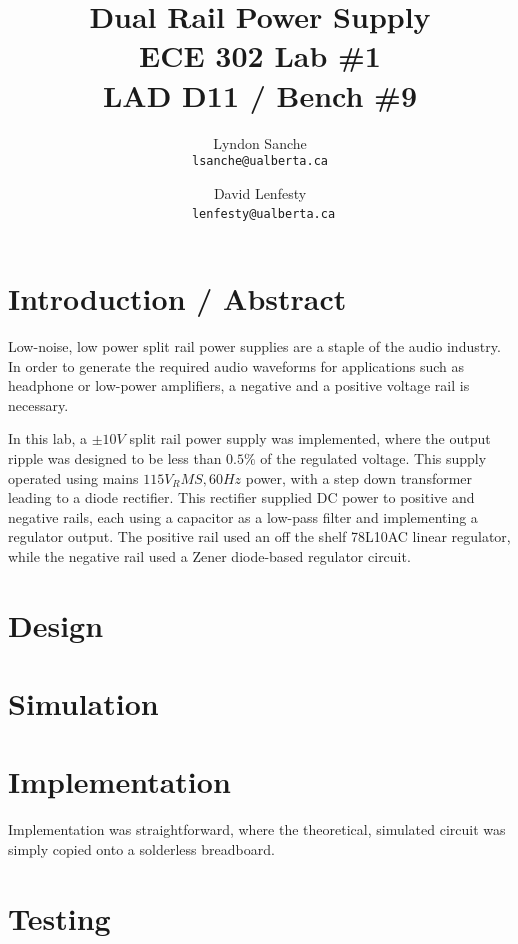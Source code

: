\documentclass[12pt]{article}
\title{ {\Huge Dual Rail Power Supply } \\
    ECE 302 Lab \#1 \\ LAD D11 / Bench \#9}
\author{
    Lyndon Sanche\\
    \texttt{lsanche@ualberta.ca}
    \and
    David Lenfesty\\\
    \texttt{lenfesty@ualberta.ca}
}
\begin{document}

\maketitle
\newpage
\tableofcontents

\newpage
{}

\section{Introduction / Abstract}

Low-noise, low power split rail power supplies are a staple of the audio industry.
In order to generate the required audio waveforms for applications such as headphone or
low-power amplifiers, a negative and a positive voltage rail is necessary.

In this lab, a $\pm 10 V$ split rail power supply was implemented,
where the output ripple was designed to be less than $ 0.5 \% $ of the
regulated voltage. This supply operated using mains $115 V_RMS, 60Hz $ power, with
a step down transformer leading to a diode rectifier. This rectifier supplied DC power to
positive and negative rails, each using a capacitor as a low-pass filter and implementing
a regulator output. The positive rail used an off the shelf 78L10AC linear regulator,
while the negative rail used a Zener diode-based regulator circuit.

\section{Design}

\section{Simulation}

\section{Implementation}

Implementation was straightforward, where the theoretical, simulated circuit was simply
copied onto a solderless breadboard. 

\section{Testing}
\end{document}
